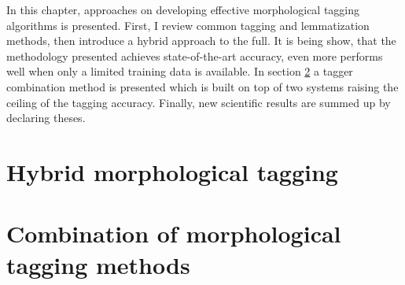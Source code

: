 In this chapter, approaches on developing effective morphological tagging algorithms is presented.
First, I review common tagging and lemmatization methods, then introduce  a hybrid approach to the full.
It is being show, that the methodology presented achieves state-of-the-art accuracy, even more performs well when only a limited training data is available.
In section \ref{} a tagger combination method is presented which is built on top of two systems raising the ceiling of the tagging accuracy.
Finally, new scientific results are summed up by declaring theses.

\section{Hybrid morphological tagging}


\pagebreak

\section{Combination of morphological tagging methods}


 
